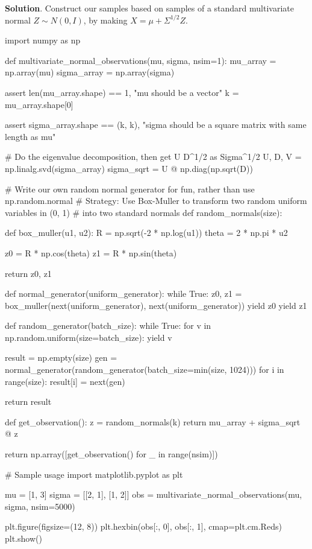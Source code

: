 \textbf{Solution}. Construct our samples based on samples of a
standard multivariate normal \(Z \sim N(0, I)\), by making
\(X = \mu + \Sigma^{1/2} Z\).

\begin{python}
import numpy as np

def multivariate_{n}ormal_observations(mu, sigma, nsim=1):
    mu_array = np.array(mu)
    sigma_array = np.array(sigma)
    
    assert len(mu_array.shape) == 1, "mu should be a vector"
    k = mu_array.shape[0]
    
    assert sigma_array.shape == (k, k), "sigma should be a square matrix with same length as mu"
    
    # Do the eigenvalue decomposition, then get U D^{1/2} as Sigma^{1/2}
    U, D, V = np.linalg.svd(sigma_array)
    sigma_sqrt = U @ np.diag(np.sqrt(D))
    
    # Write our own random normal generator for fun, rather than use np.random.normal
    # Strategy: Use Box-Muller to transform two random uniform variables in (0, 1) 
    # into two standard normals
    def random_{n}ormals(size):

        def box_muller(u1, u2):
            R = np.sqrt(-2 * np.log(u1))
            theta = 2 * np.pi * u2

            z0 = R * np.cos(theta)
            z1 = R * np.sin(theta)

            return z0, z1

        def normal_generator(uniform_generator):
            while True:
                z0, z1 = box_muller(next(uniform_generator), next(uniform_generator))
                yield z0
                yield z1

        def random_generator(batch_size):
            while True:
                for v in np.random.uniform(size=batch_size):
                    yield v

        result = np.empty(size)
        gen = normal_generator(random_generator(batch_size=min(size, 1024)))
        for i in range(size):
            result[i] = next(gen)

        return result

    def get_observation():
        z = random_{n}ormals(k)
        return mu_array + sigma_sqrt @ z
    
    return np.array([get_observation() for _ in range(nsim)])
\end{python}

\begin{python}
# Sample usage
import matplotlib.pyplot as plt

mu = [1, 3]
sigma = [[2, 1], [1, 2]]
obs = multivariate_{n}ormal_observations(mu, sigma, nsim=5000)

plt.figure(figsize=(12, 8))
plt.hexbin(obs[:, 0], obs[:, 1], cmap=plt.cm.Reds)
plt.show()
\end{python}

